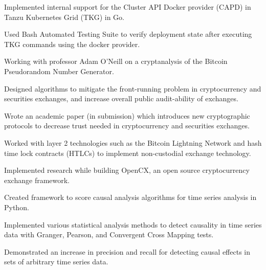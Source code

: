 
\begin{tightemize}
    \item Implemented internal support for the Cluster API Docker provider
        (CAPD) in Tanzu Kubernetes Grid (TKG) in Go.
    \item Used Bash Automated Testing Suite to verify deployment state after
        executing TKG commands using the docker provider.
\end{tightemize}
\subsectionsep

\begin{tightemize}
    \item Working with professor Adam O'Neill on a cryptanalysis of the Bitcoin
        Pseudorandom Number Generator.
\end{tightemize}
\subsectionsep

\begin{tightemize}
  \item Designed algorithms to mitigate the front-running problem in
      cryptocurrency and securities exchanges, and increase overall
      public audit-ability of exchanges.
  \item Wrote an academic paper (in submission) which
      introduces new cryptographic protocols to decrease trust needed
      in cryptocurrency and securities exchanges.
  \item Worked with layer 2 technologies such as the Bitcoin Lightning
      Network and hash time lock contracts (HTLCs) to implement
      non-custodial exchange technology.
  \item Implemented research while building OpenCX, an open source
      cryptocurrency exchange framework.
\end{tightemize}
\subsectionsep

\begin{tightemize}
\item Created framework to score causal analysis algorithms for time
    series analysis in Python.
\item Implemented various statistical analysis methods to detect
    causality in time series data with Granger, Pearson, and
    Convergent Cross Mapping tests.
\item Demonstrated an increase in precision and recall for detecting
    causal effects in sets of arbitrary time series data.
\end{tightemize}
\subsectionsep

